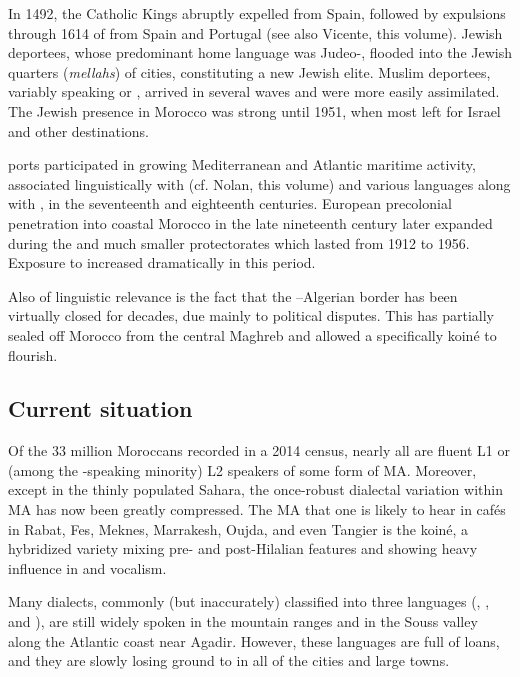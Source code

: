 \documentclass[output=paper]{langsci/langscibook}
\begin{document}
In 1492, the Catholic Kings abruptly expelled   from Spain, followed by expulsions through 1614 of  from Spain and Portugal (see also Vicente, this volume). Jewish deportees, whose predominant home language was Judeo-, flooded into the Jewish quarters (\textit{mellahs}) of  cities, constituting a new Jewish elite. Muslim deportees, variably speaking  or , arrived in several waves and were more easily assimilated. The Jewish presence in Morocco was strong until 1951, when most  left for Israel and other destinations.

 ports participated in growing Mediterranean and Atlantic maritime activity, associated linguistically with  (cf. Nolan, this volume) and various  languages along with , in the seventeenth and eighteenth centuries. European precolonial penetration into coastal Morocco in the late nineteenth century later expanded during the  and much smaller  protectorates which lasted from 1912 to 1956. Exposure to  increased dramatically in this period. 

Also of linguistic relevance is the fact that the –Algerian border has been virtually closed for decades, due mainly to political disputes. This has partially sealed off Morocco from the central Maghreb and allowed a specifically  koiné to flourish.

\subsection{Current situation}

Of the 33 million Moroccans recorded in a 2014 census, nearly all are fluent L1 or (among the -speaking minority) L2 speakers of some form of MA. Moreover, except in the thinly populated  Sahara, the once-robust dialectal variation within MA has now been greatly compressed. The MA that one is likely to hear in cafés in Rabat, Fes, Meknes, Marrakesh, Oujda, and even Tangier is the  koiné, a hybridized variety mixing pre- and post-Hilalian features and showing heavy  influence in  and vocalism.

Many  dialects, commonly (but inaccurately) classified into three languages (, , and ), are still widely spoken in the mountain ranges and in the Souss valley along the Atlantic coast near Agadir. However, these  languages are full of  loans, and they are slowly losing ground to  in all of the cities and large towns.
\end{document}
